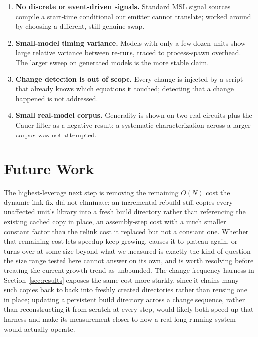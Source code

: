 \documentclass[journal]{IEEEtran}
\begin{document}
\begin{enumerate}
\item \textbf{No discrete or event-driven signals.} Standard MSL signal sources compile a start-time conditional our emitter cannot translate; worked around by choosing a different, still genuine swap.

\item \textbf{Small-model timing variance.} Models with only a few dozen units show large relative variance between re-runs, traced to process-spawn overhead. The larger sweep on generated models is the more stable claim.

\item \textbf{Change detection is out of scope.} Every change is injected by a script that already knows which equations it touched; detecting that a change happened is not addressed.

\item \textbf{Small real-model corpus.} Generality is shown on two real circuits plus the Cauer filter as a negative result; a systematic characterization across a larger corpus was not attempted.
\end{enumerate}

\section{Future Work}
\label{sec:future}

The highest-leverage next step is removing the remaining $O(N)$ cost the dynamic-link fix did not eliminate: an incremental rebuild still copies every unaffected unit's library into a fresh build directory rather than referencing the existing cached copy in place, an assembly-step cost with a much smaller constant factor than the relink cost it replaced but not a constant one. Whether that remaining cost lets speedup keep growing, causes it to plateau again, or turns over at some size beyond what we measured is exactly the kind of question the size range tested here cannot answer on its own, and is worth resolving before treating the current growth trend as unbounded. The change-frequency harness in Section~\ref{sec:results} exposes the same cost more starkly, since it chains many such copies back to back into freshly created directories rather than reusing one in place; updating a persistent build directory across a change sequence, rather than reconstructing it from scratch at every step, would likely both speed up that harness and make its measurement closer to how a real long-running system would actually operate.
\end{document}
